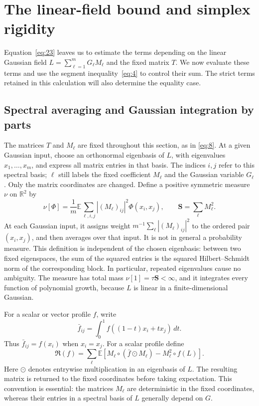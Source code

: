 \section{The linear-field bound and simplex rigidity}\label{sec:06-linear-equality}

Equation~\eqref{eq:23} leaves us to estimate the terms depending on the
linear Gaussian field $L=\sum_{\ell=1}^m G_\ell M_\ell$ and the fixed
matrix $T$. We now evaluate these terms and use the segment
inequality~\eqref{eq:4} to control their sum.  The strict terms retained in this calculation will also determine
the equality case.

\subsection{Spectral averaging and Gaussian integration by parts}

The matrices \(T\) and \(M_\ell\) are fixed throughout this section, as in
\eqref{eq:8}.  At a given Gaussian input, choose an orthonormal eigenbasis of
\(L\), with eigenvalues \(x_1,\ldots,x_m\), and express all matrix entries
in that basis.  The indices \(i,j\) refer to this spectral basis;
\(\ell\) still labels the fixed coefficient \(M_\ell\) and the Gaussian
variable \(G_\ell\). Only the matrix coordinates are changed.
Define a positive symmetric measure \(\nu\) on
\(\mathbb R^2\) by
\[
 \nu[\Phi]=\frac1m\mathbb E\sum_{\ell,i,j}
       |(M_\ell)_{ij}|^2\Phi(x_i,x_j),
 \qquad \mathbf S=\sum_\ell M_\ell^2.
\]
At each Gaussian input, it assigns weight
\(m^{-1}\sum_\ell|(M_\ell)_{ij}|^2\) to the ordered pair
\((x_i,x_j)\), and then averages over that input. It is not in general
a probability measure.
This definition is independent of the chosen eigenbasis: between two
fixed eigenspaces, the sum of the squared entries is the squared
Hilbert--Schmidt norm of the corresponding block.  In particular, repeated
eigenvalues cause no ambiguity.  The measure has total mass
\(\nu[1]=\tau\mathbf S<\infty\), and it integrates every function of
polynomial growth, because \(L\) is linear in a finite-dimensional Gaussian.

For a scalar or vector profile \(f\), write
\[
 \bar f_{ij}=\int_0^1 f((1-t)x_i+tx_j)\,dt.
\]
Thus \(\bar f_{ij}=f(x_i)\) when \(x_i=x_j\).  For a scalar profile define
\[
 \mathfrak R(f)=\sum_\ell\mathbb E\left[
       M_\ell\circ(\bar f\odot M_\ell)-M_\ell^2\circ f(L)\right].
\]
Here \(\odot\) denotes entrywise multiplication in an eigenbasis of \(L\).
The resulting matrix is returned to the fixed coordinates before taking
expectation.  This convention is essential: the matrices \(M_\ell\) are
deterministic in the fixed coordinates, whereas their entries in a spectral
basis of \(L\) generally depend on \(G\).

